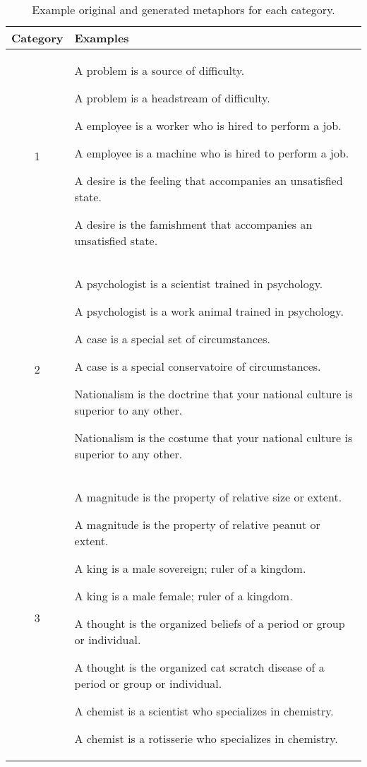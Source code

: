 \documentclass[12pt]{article}
\begin{document}
\begin{table}[H]
	\centering
	\small
	\begin{tabular}{|c|p{12cm}|} \hline
		\textbf{Category} & \textbf{Examples}\\ \hline
		1 & 
		A problem is a source of difficulty.\par
        A problem is a headstream of difficulty.\par
        \medskip
        A employee is a worker who is hired to perform a job.\par
        A employee is a machine who is hired to perform a job.\par
        \medskip
        A desire is the feeling that accompanies an unsatisfied state.\par
        A desire is the famishment that accompanies an unsatisfied state.\par
        \\ \hline
        2 & 
        A psychologist is a scientist trained in psychology.\par
        A psychologist is a work animal trained in psychology.\par
        \medskip
        A case is a special set of circumstances.\par
        A case is a special conservatoire of circumstances.\par
        \medskip
        Nationalism is the doctrine that your national culture is superior to any other.\par
        Nationalism is the costume that your national culture is superior to any other.\par
        \\ \hline
		3 & 
		A magnitude is the property of relative size or extent.\par
        A magnitude is the property of relative peanut or extent.\par
        \medskip
        A king is a male sovereign; ruler of a kingdom.\par
        A king is a male female; ruler of a kingdom.\par
        \medskip
        A thought is the organized beliefs of a period or group or individual.\par
        A thought is the organized cat scratch disease of a period or group or individual.\par
        \medskip
        A chemist is a scientist who specializes in chemistry.\par
        A chemist is a rotisserie who specializes in chemistry.\par
		\\ \hline
	\end{tabular}
	\caption{Example original and generated metaphors for each category.}
	\label{tab:results}
\end{table}
\end{document}
